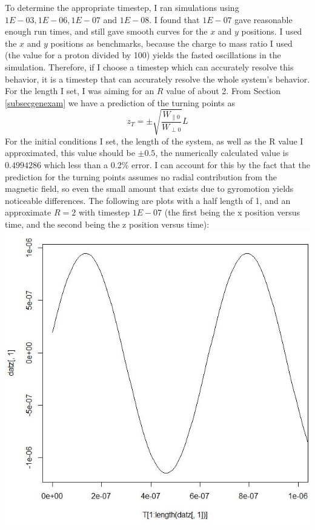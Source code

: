 \documentclass[12pt]{article}
\begin{document}
To determine the appropriate timestep, I ran simulations using $1E-03,1E-06,1E-07$ and $1E-08$. I found that $1E-07$ gave reasonable enough run times, and still gave smooth curves for the $x$ and $y$ positions. I used the $x$ and $y$ positions as benchmarks, because the charge to mass ratio I used (the value for a proton divided by 100) yields the fasted oscillations in the simulation. Therefore, if I choose a timestep which can accurately resolve this behavior, it is a timestep that can accurately resolve the whole system's behavior. For the length I set, I was aiming for an $R$ value of about 2. From Section \ref{subsecgenexam} we have a prediction of the turning points as
$$z_T=\pm\sqrt{\frac{W_{\parallel0}}{W_{\perp0}}}L$$
For the initial conditions I set, the length of the system, as well as the R value I approximated, this value should be $\pm 0.5$, the numerically calculated value is $0.4994286$ which less than a 0.2\% error. I can account for this by the fact that the prediction for the turning points assumes no radial contribution from the magnetic field, so even the small amount that exists due to gyromotion yields noticeable differences. The following are plots with a half length of 1, and an approximate $R=2$ with timestep $1E-07$ (the first being the x position versus time, and the second being the z position versus time): 
\includegraphics[scale=0.6]{xvt(L=1,R=2)}
\end{document}
